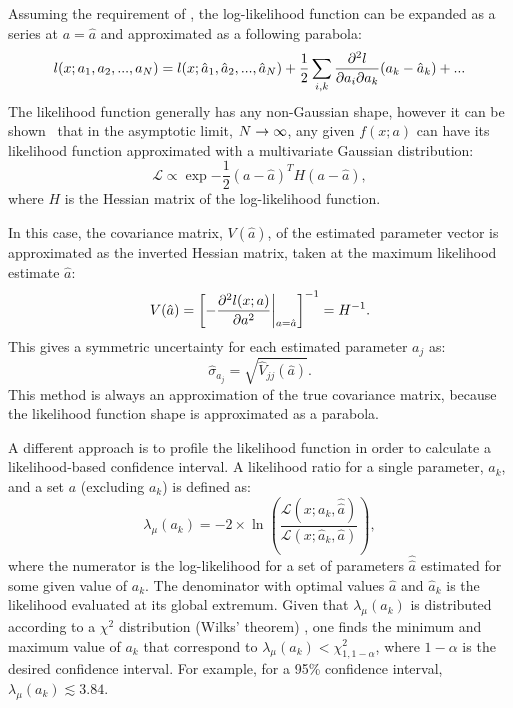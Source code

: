 Assuming the requirement of , the log-likelihood function can be expanded as a series at $a=\hat{a}$ and approximated as a following parabola:
\begin{equation}
    l(x;a_1,a_2,...,a_N) = l(x;\hat{a}_1,\hat{a}_2,...,\hat{a}_N) + \frac{1}{2}\sum_{i,k} \pdv{l}{a_i}{a_k} (a_i-\hat{a}_i)(a_k-\hat{a}_k)+...
\end{equation}
The likelihood function generally has any non-Gaussian shape, however it can be shown~\cite{James_2006} that in the asymptotic limit, $N\rightarrow\infty$, 
any given $f(x;a)$ can have its likelihood function approximated with a multivariate Gaussian distribution:
\begin{equation}
    \mathcal{L} \propto \exp{-\frac{1}{2}(a-\hat{a})^T H(a-\hat{a})},
\end{equation}
where $H$ is the Hessian matrix of the log-likelihood function. 

In this case, the covariance matrix, $V(\hat{a})$, of the estimated parameter vector is approximated as the inverted Hessian matrix, taken at the maximum likelihood estimate $\hat{a}$:
\begin{equation}
    V(\hat{a}) = \left[-\pdv[2]{l(x;a)}{a}\middle|^{}_{\ds a=\hat{a}}\right]^{-1} = H^{-1}.
\end{equation}
This gives a symmetric uncertainty for each estimated parameter $a_j$ as:
\begin{equation}
    \hat{\sigma}_{a_j} = \sqrt{\hat{V}_{jj}(\hat{a})}.
\end{equation}
This method is always an approximation of the true covariance matrix, because the likelihood function shape is approximated as a parabola.

A different approach is to profile the likelihood function in order to calculate a likelihood-based confidence interval.
A likelihood ratio for a single parameter, $a_k$, and a set $a$ (excluding $a_k$) is defined as:
\begin{equation}\label{eq:profile}
    \lambda_{\mu}(a_k) = -2 \times \ln\left(\frac{\mathcal{L}(x;a_k,\hat{\hat{a}})}{\mathcal{L}(x;\hat{a}_k,\hat{a})}\right),
\end{equation} 
where the numerator is the log-likelihood for a set of parameters $\hat{\hat{a}}$ estimated for some given value of $a_k$.
The denominator with optimal values $\hat{a}$ and $\hat{a}_k$ is the likelihood evaluated at its global extremum. 
Given that $\lambda_{\mu}(a_k)$ is distributed according to a $\chi^2$ distribution (Wilks' theorem) \cite{Wilks:1938dza},
one finds the minimum and maximum value of $a_k$ that correspond to $\lambda_{\mu}(a_k)<\chi^2_{1,1-\alpha}$, where $1-\alpha$ is the desired confidence interval.
For example, for a 95\% confidence interval, $\lambda_{\mu}(a_k)\lesssim3.84$.

